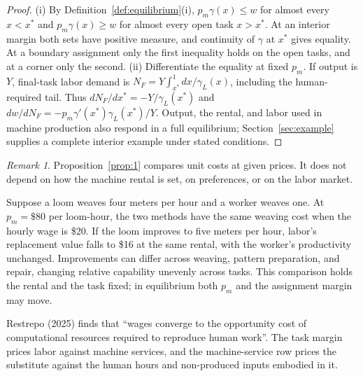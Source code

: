 \documentclass[12pt]{article}
\theoremstyle{plain}
\theoremstyle{definition}
\theoremstyle{remark}
\newtheorem*{remark}{Remark}
\begin{document}
\begin{proof}
(i) By Definition~\ref{def:equilibrium}(i), $p_m\gamma(x)\le w$ for almost every $x<x^*$ and $p_m\gamma(x)\ge w$ for almost every open task $x>x^*$. At an interior margin both sets have positive measure, and continuity of $\gamma$ at $x^*$ gives equality. At a boundary assignment only the first inequality holds on the open tasks, and at a corner only the second.
(ii) Differentiate the equality at fixed $p_m$. If output is $Y$, final-task labor demand is $N_F=Y\int_{x^*}^1dx/\gamma_L(x)$, including the human-required tail. Thus $dN_F/dx^*=-Y/\gamma_L(x^*)$ and $dw/dN_F=-p_m\gamma'(x^*)\gamma_L(x^*)/Y$. Output, the rental, and labor used in machine production also respond in a full equilibrium; Section~\ref{sec:example} supplies a complete interior example under stated conditions.
\end{proof}

\begin{remark}
Proposition~\ref{prop:1} compares unit costs at given prices. It does not depend on how the machine rental is set, on preferences, or on the labor market.
\end{remark}

Suppose a loom weaves four meters per hour and a worker weaves one. At $p_m=\$80$ per loom-hour, the two methods have the same weaving cost when the hourly wage is \$20. If the loom improves to five meters per hour, labor's replacement value falls to \$16 at the same rental, with the worker's productivity unchanged. Improvements can differ across weaving, pattern preparation, and repair, changing relative capability unevenly across tasks. This comparison holds the rental and the task fixed; in equilibrium both $p_m$ and the assignment margin may move.

Restrepo (2025) finds that ``wages converge to the opportunity cost of computational resources required to reproduce human work''.
The task margin prices labor against machine services, and the machine-service row prices the substitute against the human hours and non-produced inputs embodied in it.
\end{document}

